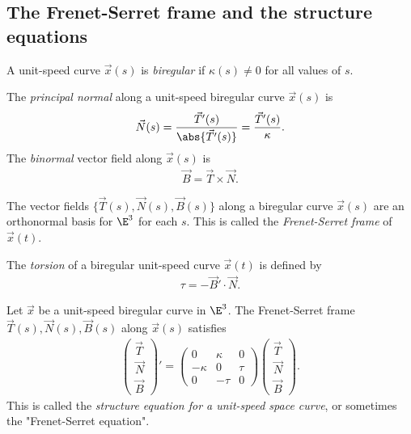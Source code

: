 \documentclass{article}
\begin{document}
\subsection{The Frenet-Serret frame and the structure equations}

\begin{definition}
    A unit-speed curve $\vec x(s)$ is \emph{biregular} if $\kappa(s)\not=0$ for
    all values of $s$.
\end{definition}

\begin{definition}
    The \emph{principal normal} along a unit-speed biregular curve $\vec x(s)$ is
    \begin{align*}
        \vec N(s) = \frac{\vec T'(s)}{\abs{\vec T'(s)}}=\frac{\vec T'(s)}{\kappa}.
    \end{align*}
    The \emph{binormal} vector field along $\vec x(s)$ is
    \begin{align*}
        \vec B = \vec T \times \vec N.
    \end{align*}
\end{definition}

\begin{proposition}
    The vector fields $\{\vec T(s), \vec N(s), \vec B(s)\}$ along a biregular curve
    $\vec x(s)$ are an orthonormal basis for $\E^3$ for each $s$. This is called the
    \emph{Frenet-Serret frame} of $\vec x(t)$.
\end{proposition}

\begin{definition}
    The \emph{torsion} of a biregular unit-speed curve $\vec x(t)$ is defined by
    \begin{align*}
        \tau = - \vec B' \cdot \vec N.
    \end{align*}
\end{definition}

\begin{theorem}
    Let $\vec x$ be a unit-speed biregular curve in $\E^3$. The Frenet-Serret
    frame $\vec T(s), \vec N(s), \vec B(s)$ along $\vec x(s)$ satisfies
    \begin{align*}
        \begin{pmatrix}
            \vec T\\
            \vec N\\
            \vec B
        \end{pmatrix}'
        = \begin{pmatrix}
            0       & \kappa & 0 \\
            -\kappa & 0      & \tau \\
            0       & -\tau  & 0
        \end{pmatrix}
        \begin{pmatrix}
            \vec T\\
            \vec N\\
            \vec B
        \end{pmatrix}.
    \end{align*}
    This is called the \emph{structure equation for a unit-speed space curve},
    or sometimes the "Frenet-Serret equation".
\end{theorem}
\end{document}
